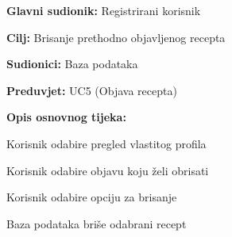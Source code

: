 					\noindent {}
					\begin{packed_item}
						
						\item \textbf{Glavni sudionik: }Registrirani korisnik
						\item \textbf{Cilj: }Brisanje prethodno objavljenog recepta
						\item \textbf{Sudionici: }Baza podataka
						\item \textbf{Preduvjet: }UC5 (Objava recepta)
						\item \textbf{Opis osnovnog tijeka:}
						
						\item[] \begin{packed_enum}
							\item Korisnik odabire pregled vlastitog profila
							\item Korisnik odabire objavu koju želi obrisati
							\item Korisnik odabire opciju za brisanje
							\item Baza podataka briše odabrani recept
						\end{packed_enum}
					\end{packed_item}
					
